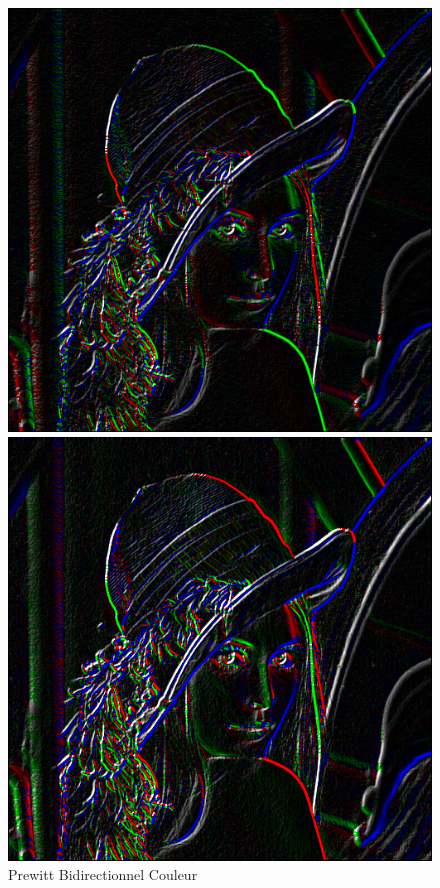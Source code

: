 \documentclass[11pt]{article}
\begin{document}
	\begin{figure}[H]
		\begin{minipage}[c]{.3\linewidth}
			\centering
			\includegraphics[scale=0.25]{Image/filtrePrewittBidirectionnelCouleur.png}
			\caption{Prewitt Bidirectionnel Couleur}
			\label{fig:PrewittBidirectionnelCouleur }
		\end{minipage} \hfill
		\begin{minipage}[c]{.3\linewidth}
		\centering
			\includegraphics[scale=0.25]{Image/filtreSobelBidirectionnelCouleur.png}

\end{minipage}
\end{figure}
\end{document}

